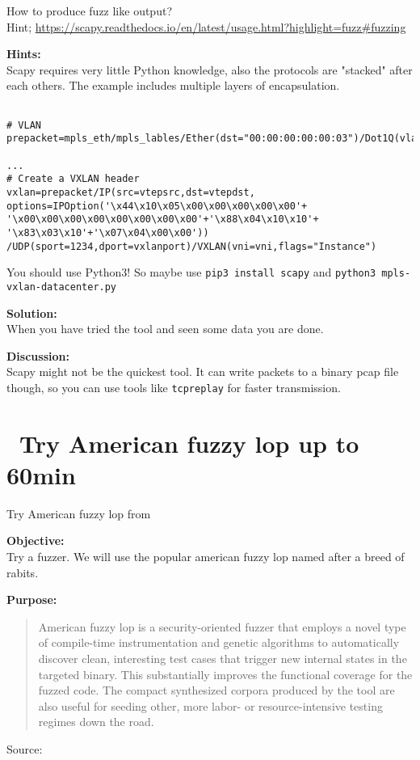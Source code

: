 \documentclass[a4paper,11pt,notitlepage]{report}
\begin{document}
How to produce fuzz like output?\\
Hint; \url{https://scapy.readthedocs.io/en/latest/usage.html?highlight=fuzz#fuzzing}

{\bf Hints:}\\
Scapy requires very little Python knowledge, also the protocols are "stacked" after each others. The example includes multiple layers of encapsulation.

\begin{verbatim}

# VLAN
prepacket=mpls_eth/mpls_lables/Ether(dst="00:00:00:00:00:03")/Dot1Q(vlan=42)

...
# Create a VXLAN header
vxlan=prepacket/IP(src=vtepsrc,dst=vtepdst, options=IPOption('\x44\x10\x05\x00\x00\x00\x00\x00'+
'\x00\x00\x00\x00\x00\x00\x00\x00'+'\x88\x04\x10\x10'+
'\x83\x03\x10'+'\x07\x04\x00\x00'))
/UDP(sport=1234,dport=vxlanport)/VXLAN(vni=vni,flags="Instance")

\end{verbatim}


You should use Python3! So maybe use \verb+pip3 install scapy+ and \verb+python3 mpls-vxlan-datacenter.py+

{\bf Solution:}\\
When you have tried the tool and seen some data you are done.

{\bf Discussion:}\\
Scapy might not be the quickest tool. It can write packets to a binary pcap file though, so you can use tools like \verb+tcpreplay+ for faster transmission.



\chapter{\faExclamationTriangle\ Try American fuzzy lop up to 60min}
\label{ex:american-fuzzy-lop}

Try American fuzzy lop from 

{\bf Objective:}\\
Try a fuzzer. We will use the popular american fuzzy lop named after a breed of rabits.


{\bf Purpose:}
\begin{quote}
American fuzzy lop is a security-oriented fuzzer that employs a novel type of compile-time instrumentation and genetic algorithms to automatically discover clean, interesting test cases that trigger new internal states in the targeted binary. This substantially improves the functional coverage for the fuzzed code. The compact synthesized corpora produced by the tool are also useful for seeding other, more labor- or resource-intensive testing regimes down the road.
\end{quote}
Source: 
\end{document}
